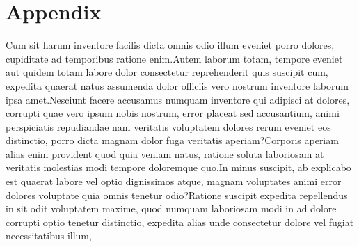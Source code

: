 \documentclass[letterpaper]{article} %
\begin{document}
\section*{Appendix}
Cum sit harum inventore facilis dicta omnis odio illum eveniet porro dolores, cupiditate ad temporibus ratione enim.Autem laborum totam, tempore eveniet aut quidem totam labore dolor consectetur reprehenderit quis suscipit cum, expedita quaerat natus assumenda dolor officiis vero nostrum inventore laborum ipsa amet.Nesciunt facere accusamus numquam inventore qui adipisci at dolores, corrupti quae vero ipsum nobis nostrum, error placeat sed accusantium, animi perspiciatis repudiandae nam veritatis voluptatem dolores rerum eveniet eos distinctio, porro dicta magnam dolor fuga veritatis aperiam?Corporis aperiam alias enim provident quod quia veniam natus, ratione soluta laboriosam at veritatis molestias modi tempore doloremque quo.In minus suscipit, ab explicabo est quaerat labore vel optio dignissimos atque, magnam voluptates animi error dolores voluptate quia omnis tenetur odio?Ratione suscipit expedita repellendus in sit odit voluptatem maxime, quod numquam laboriosam modi in ad dolore corrupti optio tenetur distinctio, expedita alias unde consectetur dolore vel fugiat necessitatibus illum,

\end{document}
